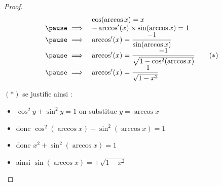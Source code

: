 \begin{frame}


\pause
\bigskip



\end{frame}



\begin{frame}

\mybox{$\displaystyle \arccos'(x) = \frac{-1}{\sqrt{1-x^2}} \qquad \forall x \in ]-1,1[$}

\pause

\begin{proof}
\vspace*{-1.5ex}
$$\begin{array}{cl}
          & \displaystyle \cos(\arccos x) = x \\
\pause
 \implies & \displaystyle  -\arccos'(x) \times  \sin(\arccos x) = 1 \\
\pause 
 \implies & \displaystyle  \arccos'(x) = \frac{-1}{\sin(\arccos x)} \\
\pause 
 \implies & \displaystyle  \arccos'(x) = \frac{-1}{\sqrt{1-\cos^2(\arccos x)}} \qquad (*) \\
\pause 
 \implies & \displaystyle  \arccos'(x) = \frac{-1}{\sqrt{1-x^2}} \\  
\end{array}$$

\pause 

\vspace*{-1ex}
$(*)$ se justifie ainsi :
\begin{itemize}
  \item $\cos^2 y + \sin^2 y = 1$ \quad on substitue $y= \arccos x$
\pause  
  \item donc $\cos^2(\arccos x)+ \sin^2(\arccos x) = 1$
\pause  
  \item donc $x^2+ \sin^2(\arccos x) = 1$
\pause  
  \item ainsi $\sin(\arccos x) = + \sqrt{1-x^2}$ \qedhere
\end{itemize}

\end{proof}
\end{frame}



